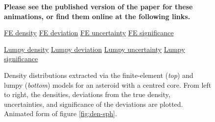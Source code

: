 \begin{figure}
  \textbf{Please see the published version of the paper for these animations, or find them online at the following links.}

  \href{https://github.com/jack-dinsmore/asteroid-tidal-torque/tree/main/paper/gifs/sph-3-fe-d.mp4}{FE density} \hfill
  \href{https://github.com/jack-dinsmore/asteroid-tidal-torque/tree/main/paper/gifs/sph-3-fe-s.mp4}{FE deviation} \hfill
  \href{https://github.com/jack-dinsmore/asteroid-tidal-torque/tree/main/paper/gifs/sph-3-fe-u.mp4}{FE uncertainty} \hfill
  \href{https://github.com/jack-dinsmore/asteroid-tidal-torque/tree/main/paper/gifs/sph-3-fe-r.mp4}{FE significance}

  \href{https://github.com/jack-dinsmore/asteroid-tidal-torque/tree/main/paper/gifs/sph-3-l-d.mp4}{Lumpy density} \hfill
  \href{https://github.com/jack-dinsmore/asteroid-tidal-torque/tree/main/paper/gifs/sph-3-l-s.mp4}{Lumpy deviation} \hfill
  \href{https://github.com/jack-dinsmore/asteroid-tidal-torque/tree/main/paper/gifs/sph-3-l-u.mp4}{Lumpy uncertainty} \hfill
  \href{https://github.com/jack-dinsmore/asteroid-tidal-torque/tree/main/paper/gifs/sph-3-l-r.mp4}{Lumpy significance}

  \caption{Density distributions extracted via the finite-element (\textit{top}) and lumpy (\textit{bottom}) models for an asteroid with a centred core. From left to right, the densities, deviations from the true density, uncertainties, and significance of the deviations are plotted. Animated form of figure \ref{fig:den-sph}.}
  \label{fig:animated-sph}
\end{figure}

